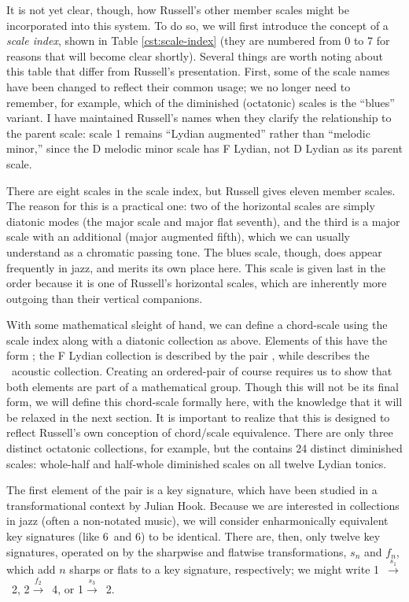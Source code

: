 It is not yet clear, though, how Russell's other member scales might be
incorporated into this system. To do so, we will first introduce the concept
of a \emph{scale index}, shown in Table \ref{cst:scale-index} (they are
numbered from 0 to 7 for reasons that will become clear shortly). Several
things are worth noting about this table that differ from Russell's
presentation. First, some of the scale names have been changed to reflect
their common usage; we no longer need to remember, for example, which of the
diminished (octatonic) scales is the ``blues'' variant. I have
maintained Russell's names when they clarify the relationship to the parent
scale: scale 1 remains ``Lydian augmented'' rather than ``melodic minor,''
since the D melodic minor scale has F Lydian, not D Lydian as its parent scale.

There are eight scales in the scale index, but Russell gives eleven member
scales. The reason for this is a practical one: two of the horizontal scales
are simply diatonic modes (the major scale and major flat seventh), and the
third is a major scale with an additional \sharp{} (major augmented
fifth), which we can usually understand as a chromatic passing tone. The blues
scale, though, does appear frequently in jazz, and merits its own place
here. This scale is given last in the order because it is one of
Russell's horizontal scales, which are inherently more outgoing than their
vertical companions.

With some mathematical sleight of hand, we can define a chord-scale \gis using
the scale index along with a diatonic collection as above. Elements of this
\gis have the form ;
the F Lydian collection is described by the pair ,
while  describes the \Eflat\ acoustic
collection. Creating an ordered-pair \gis of course requires us to show that
both elements are part of a mathematical group. Though this will not be its
final form, we will define this chord-scale \gis formally
here, with the knowledge that it will be relaxed in the next section. It is
important to realize that this \gis is designed to reflect Russell's own conception
of chord/scale equivalence. There are only three distinct octatonic
collections, for example, but the \gis contains 24 distinct diminished scales:
whole-half and half-whole diminished scales on all twelve Lydian tonics.

The first element of the pair is a key signature, which have been studied in a
transformational context by Julian Hook. Because we are interested
in collections in jazz (often a non-notated music), we will consider
enharmonically equivalent key signatures (like 6\sharp\ and 6\kern0.8pt\flat) to be
identical. There are, then, only twelve key signatures, operated on by the
sharpwise and flatwise transformations, $s_n$ and $f_n$, which add $n$ sharps
or flats to a key signature, respectively; we might write \mbox{1\sharp
$\xrightarrow{\ s_1\ }$ 2\sharp}, \mbox{2\flat $\xrightarrow{\ f_2\ }$ 4\flat}, or
\mbox{1\flat $\xrightarrow{\ s_3\ }$ 2\sharp}.

